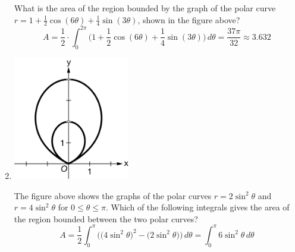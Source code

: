\documentclass[12pt]{article}
\begin{document}
\begin{enumerate}
\begin{center}
	      \end{center}
	      What is the area of the region bounded by the graph of the polar curve $r= 1 + \frac{1}{2}\cos(6\theta) + \frac{1}{4} \sin(3\theta)$, shown in the figure above?
		  $$A=\frac{1}{2} \cdot\int_{0}^{2\pi} \bigg(1 + \frac{1}{2}\cos(6\theta) + \frac{1}{4} \sin(3\theta)\bigg) \, d\theta = \frac{37\pi}{32} \approx \boxed{3.632}$$
	\item 
	      \begin{center}
	      	\includegraphics[width=2in]{7.037}
	      \end{center}      
	      The figure above shows the graphs of the polar curves $r=2\sin^2\theta$ and $r=4\sin^2\theta$ for $0\leq \theta\leq\pi$. Which of the following integrals gives the area of the region bounded between the two polar curves?
		  $$A = \frac{1}{2} \int_{0}^{\pi} \bigg(\big(4\sin^2\theta\big)^2 - \big(2\sin^2\theta\big)\bigg)\, d\theta  = \boxed{\int_{0}^{\pi} 6\sin^2\theta \, d\theta}$$
\end{enumerate}
\end{document}
